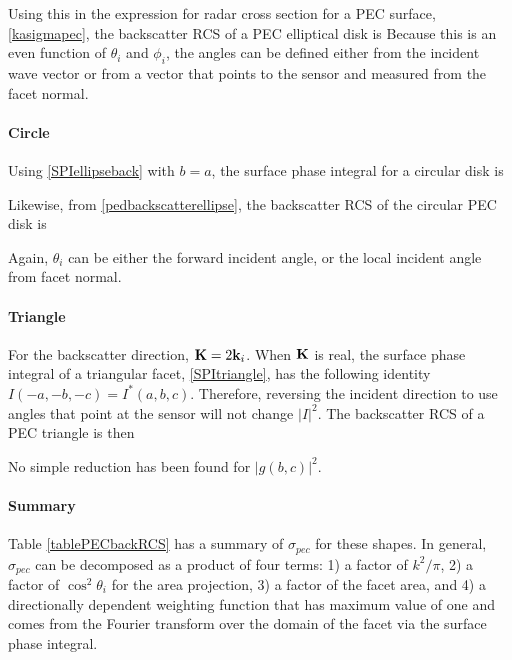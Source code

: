 Using this in the expression for radar cross section for a PEC surface, \eqref{kasigmapec}, the backscatter RCS of a PEC elliptical disk is  
%
Because this is an even function of $\theta_i$ and $\phi_i$, the angles can be defined either from the incident wave vector or from a vector that points to the sensor and measured from the facet normal.  

\paragraph{Circle} Using \eqref{SPIellipseback} with $b=a$, the surface phase integral for a circular disk is

Likewise, from \eqref{pedbackscatterellipse}, the backscatter RCS of the circular PEC disk is

Again, $\theta_i$ can be either the forward incident angle, or the local incident angle from facet normal.

\paragraph{Triangle} For the backscatter direction, $\mathbf{K} = 2 \mathbf{k}_i $. When $\mathbf{K}$ is real, the surface phase integral of a triangular facet, \eqref{SPItriangle}, has the following identity $I(-a,-b,-c) = I^*(a,b,c)$. Therefore, reversing the incident direction to use angles that point at the sensor will not change $\vert I \vert^2$. The backscatter RCS of a PEC triangle is then

No simple reduction has been found for $\vert g(b,c)\vert^2$. 

\paragraph{Summary}
Table \ref{tablePECbackRCS} has a summary of $\sigma_{pec}$ for these shapes. In general, $\sigma_{pec}$ can be decomposed as a product of four terms: 1) a factor of $k^2/\pi$, 2) a factor of $\cos^2\theta_i$ for the area projection, 3) a factor of the facet area, and 4) a directionally dependent weighting function that has maximum value of one and comes from the Fourier transform over the domain of the facet via the surface phase integral. 
 
